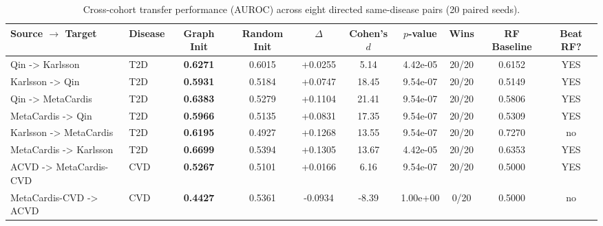 \begin{table}[t]
\centering
\caption{Cross-cohort transfer performance (AUROC) across eight directed same-disease pairs (20 paired seeds).}
\label{tab:loco_transfer}
\begin{tabular}{llcccccccc}
\toprule
Source $\to$ Target & Disease & Graph Init & Random Init & $\Delta$ & Cohen's $d$ & $p$-value & Wins & RF Baseline & Beat RF? \\
\midrule
Qin -> Karlsson & T2D & \textbf{0.6271} & 0.6015 & +0.0255 & 5.14 & 4.42e-05 & 20/20 & 0.6152 & YES \\
Karlsson -> Qin & T2D & \textbf{0.5931} & 0.5184 & +0.0747 & 18.45 & 9.54e-07 & 20/20 & 0.5149 & YES \\
Qin -> MetaCardis & T2D & \textbf{0.6383} & 0.5279 & +0.1104 & 21.41 & 9.54e-07 & 20/20 & 0.5806 & YES \\
MetaCardis -> Qin & T2D & \textbf{0.5966} & 0.5135 & +0.0831 & 17.35 & 9.54e-07 & 20/20 & 0.5309 & YES \\
Karlsson -> MetaCardis & T2D & \textbf{0.6195} & 0.4927 & +0.1268 & 13.55 & 9.54e-07 & 20/20 & 0.7270 & no \\
MetaCardis -> Karlsson & T2D & \textbf{0.6699} & 0.5394 & +0.1305 & 13.67 & 4.42e-05 & 20/20 & 0.6353 & YES \\
ACVD -> MetaCardis-CVD & CVD & \textbf{0.5267} & 0.5101 & +0.0166 & 6.16 & 9.54e-07 & 20/20 & 0.5000 & YES \\
MetaCardis-CVD -> ACVD & CVD & \textbf{0.4427} & 0.5361 & -0.0934 & -8.39 & 1.00e+00 & 0/20 & 0.5000 & no \\
\bottomrule
\end{tabular}
\end{table}
